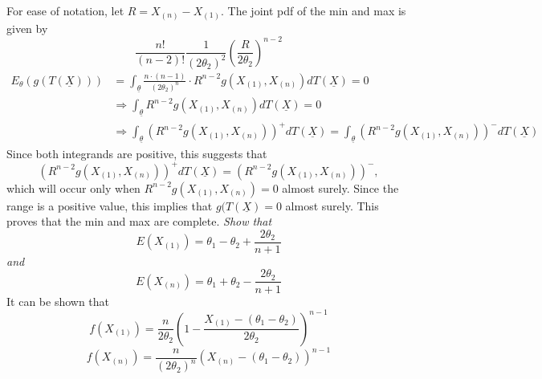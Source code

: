 \documentclass[11pt]{report}
\begin{document}
For ease of notation, let $R = X_{(n)} - X_{(1)}$. The joint pdf of the min and max is given by
\[ \frac{n!}{(n-2)!} \frac{1}{\left( 2 \theta_2 \right)^2} \left( \frac{R}{2 \theta_2} \right) ^{n-2} \]
\begin{align*}
E_\theta(g(T(\underline{X}))) &= \int_{\underline{\theta}} \frac{n \cdot (n-1)}{\left( 2 \theta_2 \right)^n } \cdot R^{n-2} g(X_{(1)}, X_{(n)}) dT(\underline{X}) = 0 \\
& \Rightarrow  \int_{\underline{\theta}} R^{n-2} g(X_{(1)}, X_{(n)}) dT(\underline{X}) = 0 \\
& \Rightarrow  \int_{\underline{\theta}} \left( R^{n-2} g(X_{(1)}, X_{(n)}) \right)^+ dT(\underline{X}) = \int_{\underline{\theta}} \left( R^{n-2} g(X_{(1)}, X_{(n)}) \right)^- dT(\underline{X})
\end{align*}
Since both integrands are positive, this suggests that 
\[ \left( R^{n-2} g(X_{(1)}, X_{(n)}) \right)^+ dT(\underline{X}) = \left( R^{n-2} g(X_{(1)}, X_{(n)}) \right)^-, \]
which will occur only when $R^{n-2} g(X_{(1)}, X_{(n)}) = 0$ almost surely. Since the range is a positive value, this implies that $g(T(\underline{X}) = 0$ almost surely. This proves that the min and max are complete. 
\newline
\newline
\emph{Show that 
\[ E(X_{(1)}) = \theta_1 - \theta_2 + \frac{2 \theta_2}{n+1} \] and 
\[ E(X_{(n)}) = \theta_1 + \theta_2 - \frac{2 \theta_2}{n+1} \] }
It can be shown that
\[ f(X_{(1)}) = \frac{n}{ 2 \theta_2 } \left( 1 - \frac{X_{(1)} - (\theta_1-\theta_2)}{2 \theta_2} \right)^{n-1} \]
\[ f(X_{(n)}) = \frac{n}{\left( 2 \theta_2 \right)^n} \left( X_{(n)} - (\theta_1 - \theta_2) \right)^{n-1} \]
\end{document}

